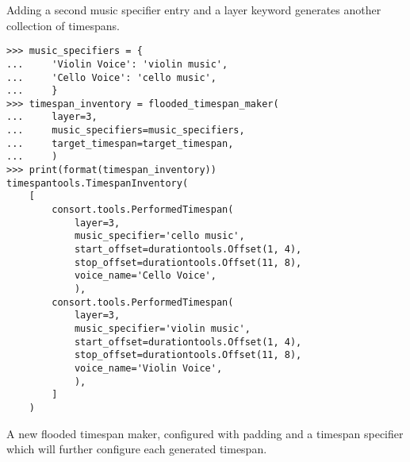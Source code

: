 Adding a second music specifier entry and a layer keyword generates another
collection of timespans.

\begin{comment}
<abjad>
music_specifiers = {
    'Violin Voice': 'violin music',
    'Cello Voice': 'cello music',
    }
timespan_inventory = flooded_timespan_maker(
    layer=3,
    music_specifiers=music_specifiers,
    target_timespan=target_timespan,
    )
print(format(timespan_inventory))
</abjad>
\end{comment}

\begin{singlespacing}
\vspace{-0.5\baselineskip}
\begin{lstlisting}
>>> music_specifiers = {
...     'Violin Voice': 'violin music',
...     'Cello Voice': 'cello music',
...     }
>>> timespan_inventory = flooded_timespan_maker(
...     layer=3,
...     music_specifiers=music_specifiers,
...     target_timespan=target_timespan,
...     )
>>> print(format(timespan_inventory))
timespantools.TimespanInventory(
    [
        consort.tools.PerformedTimespan(
            layer=3,
            music_specifier='cello music',
            start_offset=durationtools.Offset(1, 4),
            stop_offset=durationtools.Offset(11, 8),
            voice_name='Cello Voice',
            ),
        consort.tools.PerformedTimespan(
            layer=3,
            music_specifier='violin music',
            start_offset=durationtools.Offset(1, 4),
            stop_offset=durationtools.Offset(11, 8),
            voice_name='Violin Voice',
            ),
        ]
    )
\end{lstlisting}
\end{singlespacing}

A new flooded timespan maker, configured with padding and a timespan specifier
which will further configure each generated timespan.

\begin{comment}
<abjad>
flooded_timespan_maker = consort.FloodedTimespanMaker(
    padding=Duration(1, 4),
    timespan_specifier=consort.TimespanSpecifier(
        minimum_duration=Duration(1, 8),
        ),
    )
timespan_inventory = flooded_timespan_maker(
    layer=5,
    music_specifiers=music_specifiers,
    target_timespan=target_timespan,
    )
print(format(timespan_inventory))
</abjad>
\end{comment}

